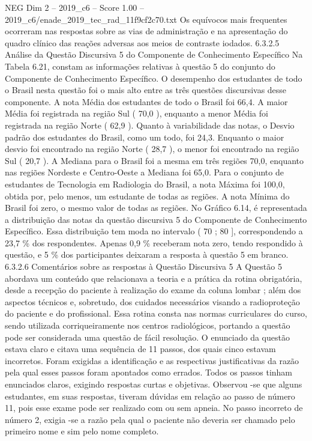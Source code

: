 \begin{textsample}{NEG Dim 2 – 2019\_c6 – Score 1.00 – 2019\_c6/enade\_2019\_tec\_rad\_11f9cf2c70.txt}
Os equívocos mais frequentes ocorreram nas respostas sobre as vias de administração e na apresentação do quadro clínico das reações adversas aos meios de contraste iodados. 6.3.2.5 Análise da Questão Discursiva 5 do Componente de Conhecimento Específico Na Tabela 6.21, constam as informações relativas à questão 5 do conjunto do Componente de Conhecimento Específico.
O desempenho dos estudantes de todo o Brasil nesta questão foi o mais alto entre as três questões discursivas desse componente.
A nota Média dos estudantes de todo o Brasil foi 66,4.
A maior Média foi registrada na região Sul ( 70,0 ), enquanto a menor Média foi registrada na região Norte ( 62,9 ).
Quanto à variabilidade das notas, o Desvio padrão dos estudantes do Brasil, como um todo, foi 24,3.
Enquanto o maior desvio foi encontrado na região Norte ( 28,7 ), o menor foi encontrado na região Sul ( 20,7 ).
A Mediana para o Brasil foi a mesma em três regiões 70,0, enquanto nas regiões Nordeste e Centro-Oeste a Mediana foi 65,0.
Para o conjunto de estudantes de Tecnologia em Radiologia do Brasil, a nota Máxima foi 100,0, obtida por, pelo menos, um estudante de todas as regiões.
A nota Mínima do Brasil foi zero, o mesmo valor de todas as regiões.
No Gráfico 6.14, é representada a distribuição das notas da questão discursiva 5 do Componente de Conhecimento Específico.
Essa distribuição tem moda no intervalo ( 70 ; 80 ], correspondendo a 23,7 \% dos respondentes.
Apenas 0,9 \% receberam nota zero, tendo respondido à questão, e 5 \% dos participantes deixaram a resposta à questão 5 em branco. 6.3.2.6 Comentários sobre as respostas à Questão Discursiva 5 A Questão 5 abordava um conteúdo que relacionava a teoria e a prática da rotina obrigatória, desde a recepção do paciente à realização do exame da coluna lombar ; além dos aspectos técnicos e, sobretudo, dos cuidados necessários visando a radioproteção do paciente e do profissional.
Essa rotina consta nas normas curriculares do curso, sendo utilizada corriqueiramente nos centros radiológicos, portando a questão pode ser considerada uma questão de fácil resolução.
O enunciado da questão estava claro e citava uma sequência de 11 passos, dos quais cinco estavam incorretos.
Foram exigidas a identificação e as respectivas justificativas da razão pela qual esses passos foram apontados como errados.
Todos os passos tinham enunciados claros, exigindo respostas curtas e objetivas.
Observou -se que alguns estudantes, em suas respostas, tiveram dúvidas em relação ao passo de número 11, pois esse exame pode ser realizado com ou sem apneia.
No passo incorreto de número 2, exigia -se a razão pela qual o paciente não deveria ser chamado pelo primeiro nome e sim pelo nome completo.

\end{textsample}
